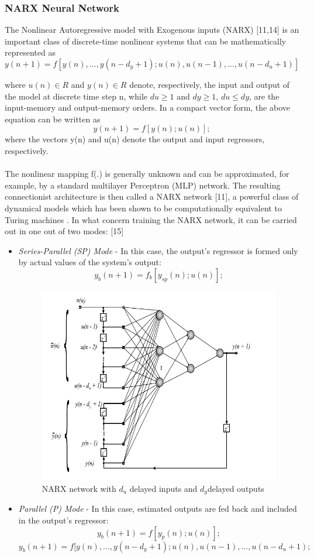 \documentclass[12pt,a4paper]{report}
\begin{document}
\subsubsection{NARX Neural Network}
The Nonlinear Autoregressive model with Exogenous inputs (NARX) [11,14]
is an important class of discrete-time nonlinear systems that can be mathematically
represented as
$$y(n + 1)=f [y(n),...,y(n-d_y+1);u(n),u(n-1),...,u(n-d_u+1)] $$

where $u(n) \in R$ and $y(n)\in R$ denote, respectively, the input and output of the model at discrete time step n, while $du  \geq 1$ and $dy \geq 1$, $du \leq dy$, are the
input-memory and output-memory orders. In a compact vector form,  
the above equation can be written as
$$y(n + 1) = f[y(n); u(n)]; $$
where the vectors y(n) and u(n) denote the output and input regressors, respectively.
\paragraph{} 
The nonlinear mapping f(.) is generally unknown and can be approximated,
for example, by a standard multilayer Perceptron (MLP) network. The resulting connectionist architecture is then called a NARX network [11], a powerful class of dynamical models which has been shown to be computationally equivalent to Turing machines . In what concern training the NARX
network, it can be carried out in one out of two modes: [15]

\begin{itemize}
\item \textit{Series-Parallel (SP) Mode} - In this case, the output's regressor is formed
only by actual values of the system's output:
$$y_b(n + 1)=f_b[y_{sp}(n); u(n)];$$
\begin{figure}[h!]
	\centering
		\includegraphics[scale=0.8]{screenshots/sp_nn.png}
		\caption{NARX network with $d_u$ delayed inputs and $d_y $delayed outputs}
\end{figure}
\item \textit{Parallel (P) Mode} - In this case, estimated outputs are fed back and
included in the output's regressor:
$$y_b(n + 1)=f[y_p(n); u(n)];$$
$$y_b(n + 1)=f[y(n),...,y(n-d_y + 1); u(n),u(n-1),..., u(n-d_u+1);$$
\end{itemize}
\end{document}
